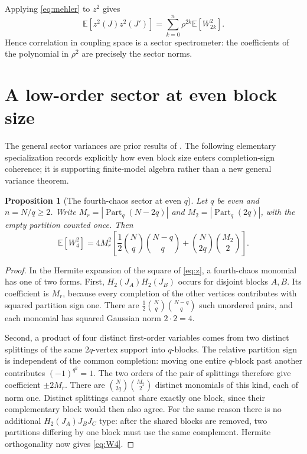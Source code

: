 \documentclass[11pt,a4paper]{article}
\newtheorem{proposition}[theorem]{Proposition}
\theoremstyle{definition}
\theoremstyle{remark}
\newcommand{\E}{\mathbb{E}}
\begin{document}
Applying \eqref{eq:mehler} to $z^2$ gives
\begin{equation}
 \E[z^2(J)z^2(J')]=\sum_{k=0}^{n}\rho^{2k}\E[W_{2k}^2].
 \label{eq:spectroscopy}
\end{equation}
Hence correlation in coupling space is a sector spectrometer: the coefficients of the
polynomial in $\rho^2$ are precisely the sector norms.

\section{A low-order sector at even block size}

The general sector variances are prior results of \citet{Mukhametzhanov2022}.
The following elementary specialization records explicitly how even block size enters
completion-sign coherence; it is supporting finite-model algebra rather than a new general
variance theorem.

\begin{proposition}[The fourth-chaos sector at even $q$]\label{prop:W4}
Let $q$ be even and $n=N/q\ge2$.
Write $M_r=|\operatorname{Part}_q(N-2q)|$ and
$M_2=|\operatorname{Part}_q(2q)|$, with the empty partition counted once.
Then
\begin{equation}
 \E[W_4^2]=4M_r^2\left[
 \frac12\binom Nq\binom{N-q}q+
 \binom N{2q}\binom{M_2}{2}\right].
 \label{eq:W4}
\end{equation}
\end{proposition}

\begin{proof}
In the Hermite expansion of the square of \eqref{eq:z}, a fourth-chaos monomial has
one of two forms.
First, $H_2(J_A)H_2(J_B)$ occurs for disjoint blocks $A,B$.
Its coefficient is $M_r$, because every completion of the other vertices contributes
with squared partition sign one.
There are $\frac12\binom Nq\binom{N-q}q$ such unordered pairs, and each monomial
has squared Gaussian norm $2\cdot2=4$.

Second, a product of four distinct first-order variables comes from two distinct
splittings of the same $2q$-vertex support into $q$-blocks.
The relative partition sign is independent of the common completion: moving one entire
$q$-block past another contributes $(-1)^{q^2}=1$.
The two orders of the pair of splittings therefore give coefficient $\pm2M_r$.
There are $\binom N{2q}\binom{M_2}{2}$ distinct monomials of this kind, each of norm one.
Distinct splittings cannot share exactly one block, since their complementary block would
then also agree.
For the same reason there is no additional $H_2(J_A)J_BJ_C$ type: after the shared
blocks are removed, two partitions differing by one block must use the same complement.
Hermite orthogonality now gives \eqref{eq:W4}.
\end{proof}
\end{document}
